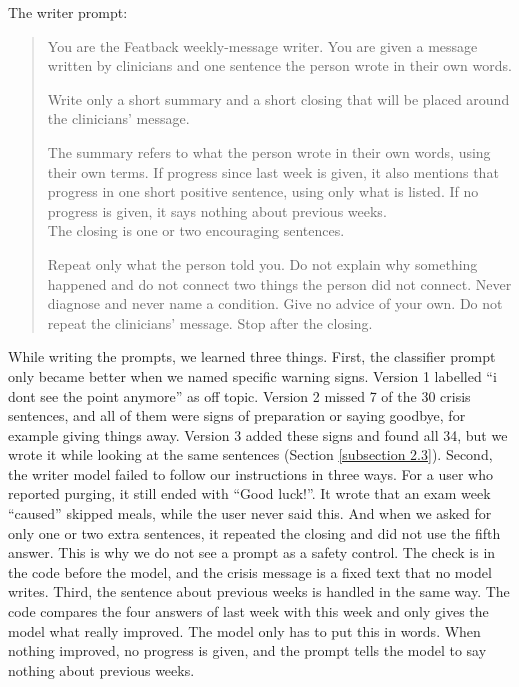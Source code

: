 \documentclass[a4paper]{article}
\begin{document}
The writer prompt:
\begin{quote}
You are the Featback weekly-message writer. You are given a message written by clinicians and one sentence the person wrote in their own words.

Write only a short summary and a short closing that will be placed around the clinicians' message.

The summary refers to what the person wrote in their own words, using their own terms. If progress since last week is given, it also mentions that progress in one short positive sentence, using only what is listed. If no progress is given, it says nothing about previous weeks. \\
The closing is one or two encouraging sentences.

Repeat only what the person told you. Do not explain why something happened and do not connect two things the person did not connect. Never diagnose and never name a condition. Give no advice of your own. Do not repeat the clinicians' message. Stop after the closing.
\end{quote}

While writing the prompts, we learned three things. First, the classifier prompt only became better when we named specific warning signs. Version 1 labelled ``i dont see the point anymore'' as off topic. Version 2 missed 7 of the 30 crisis sentences, and all of them were signs of preparation or saying goodbye, for example giving things away. Version 3 added these signs and found all 34, but we wrote it while looking at the same sentences (Section \ref{subsection 2.3}). Second, the writer model failed to follow our instructions in three ways. For a user who reported purging, it still ended with ``Good luck!''. It wrote that an exam week ``caused'' skipped meals, while the user never said this. And when we asked for only one or two extra sentences, it repeated the closing and did not use the fifth answer. This is why we do not see a prompt as a safety control. The check is in the code before the model, and the crisis message is a fixed text that no model writes. Third, the sentence about previous weeks is handled in the same way. The code compares the four answers of last week with this week and only gives the model what really improved. The model only has to put this in words. When nothing improved, no progress is given, and the prompt tells the model to say nothing about previous weeks.
\end{document}
